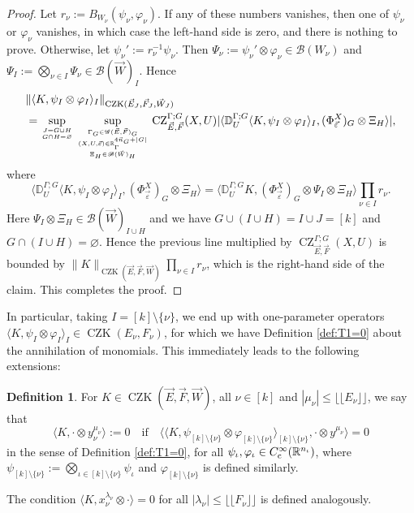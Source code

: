 \documentclass[11pt, reqno]{amsart}
\theoremstyle{definition}
\newtheorem{definition}[theorem]{Definition}
\theoremstyle{remark}
\numberwithin{equation}{section}
\newcommand{\vE}{\vec E}
\newcommand{\vF}{\vec F}
\newcommand{\R}{\mathbb R}
\newcommand{\vn}{\vec n}
\newcommand{\eps}{\varepsilon}
\newcommand{\Floor}[1]{\lfloor\!\lfloor #1 \rfloor\!\rfloor}
\newcommand{\pair}[2]{\langle #1, #2 \rangle}
\newcommand{\abs}[1]{|#1|}
\newcommand{\Norm}[2]{\|#1\|_{#2}}
\begin{document}
\begin{proof}
Let $r_\nu:=B_{W_\nu}(\psi_\nu,\varphi_\nu)$. If any of these numbers vanishes, then one of $\psi_\nu$ or $\varphi_\nu$ vanishes, in which case the left-hand side is zero, and there is nothing to prove. Otherwise, let $\psi_\nu':=r_\nu^{-1}\psi_\nu$. Then $\Psi_\nu:=\psi_\nu'\otimes\varphi_\nu\in\mathscr B(W_\nu)$ and $\Psi_I:=\bigotimes_{\nu\in I}\Psi_\nu\in \mathscr B(\vec W)_I$. Hence
\begin{equation*}
\begin{split}
  &\Norm{\pair{K}{\psi_I\otimes\varphi_I}_I}{\operatorname{CZK}(\vE_J,\vF_J,\vec W_J)} \\
  &=\sup_{\genfrac{}{}{0pt}{}{{J=G\cup H}}{G\cap H=\varnothing}}
  \sup_{\genfrac{}{}{0pt}{}{\genfrac{}{}{0pt}{}{\Gamma_G\in\mathscr G(\vE,\vF)_G}{(X,U,\vec\eps)\in\R^{4\vn_G+\abs{G}}_{\Gamma}}}{
    \Xi_{H}\in \mathscr B(\vec W)_H}}
  \operatorname{CZ}_{\vE,\vF}^{\Gamma;G}(X,U)
  \abs{\pair{\mathbb D^{\Gamma;G}_U
  \pair{K}{\psi_I\otimes\varphi_I}_I  }{(\Phi_{\vec\eps}^X)_G\otimes \Xi_H}},
\end{split}
\end{equation*}
where
\begin{equation*}
  \pair{\mathbb D^{\Gamma;G}_U
  \pair{K}{\psi_I\otimes\varphi_I}_I  }{(\Phi_{\vec\eps}^X)_G\otimes \Xi_H}
  =\pair{\mathbb D^{\Gamma;G}_U K}{ (\Phi_{\vec\eps}^X)_G\otimes \Psi_I \otimes \Xi_H} \prod_{\nu\in I}r_\nu.
\end{equation*}
Here $ \Psi_I \otimes \Xi_H\in\mathscr B(\vec W)_{I\cup H}$ and we have $G\cup(I\cup H)=I\cup J=[k]$ and $G\cap(I\cup H)=\varnothing$. Hence the previous line multiplied by $\operatorname{CZ}_{\vE,\vF}^{\Gamma;G}(X,U)$ is bounded by
$\Norm{K}{\operatorname{CZK}(\vE,\vF,\vec W)}\prod_{\nu\in I}r_\nu$, which is the right-hand side of the claim. This completes the proof.
\end{proof}

In particular, taking $I=[k]\setminus\{\nu\}$, we end up with one-parameter operators $\pair{K}{\psi_I\otimes\varphi_I}_I\in\operatorname{CZK}(E_\nu,F_\nu)$, for which we have Definition \ref{def:T1=0} about the annihilation of monomials. This immediately leads to the following extensions:

\begin{definition}\label{def:T1=0k}
For $K\in\operatorname{CZK}(\vE,\vF,\vec W)$, all $\nu\in[k]$ and $\abs{\mu_\nu}\leq\Floor{E_\nu}$, we say that
\begin{equation*}
  \pair{K}{\cdot\otimes y_\nu^{\mu_\nu}}:=0\quad\text{if}\quad
  \pair{\pair{K}{\psi_{[k]\setminus\{\nu\}}\otimes\varphi_{[k]\setminus\{\nu\}}}_{[k]
  \setminus\{\nu\}}}{\cdot\otimes y^{\mu_\nu}}=0
\end{equation*}
in the sense of Definition \ref{def:T1=0}, for all $\psi_{\iota},\varphi_{\iota}\in C_{\rm c}^\infty(\R^{n_\iota})$, where $\psi_{[k]\setminus\{\nu\}}:=\bigotimes_{\iota\in[k]\setminus\{\nu\}}\psi_\iota$ and $\varphi_{[k]\setminus\{\nu\}}$ is defined similarly.

The condition $\pair{K}{x_\nu^{\lambda_\nu} \otimes\cdot }=0$
for all $\abs{\lambda_\nu}\leq\Floor{F_\nu}$ is defined analogously.
\end{definition}
\end{document}
